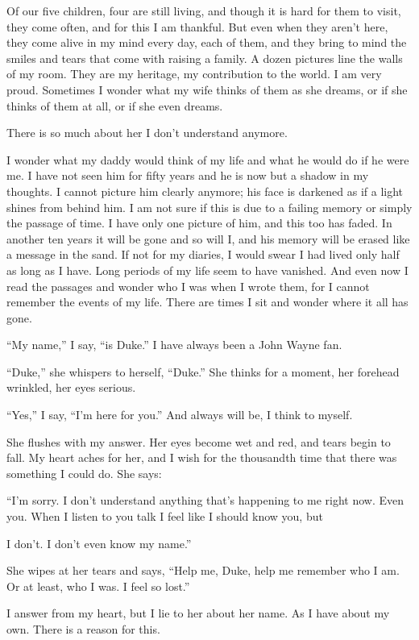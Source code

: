 \documentclass[10pt, twoside, openright]{book}
\begin{document}
Of our five children, four are still living, and though it is hard for
them to visit, they come often, and for this I am thankful. But even
when they aren't here, they come alive in my mind every day, each of
them, and they bring to mind the smiles and tears that come with raising
a family. A dozen pictures line the walls of my room. They are my
heritage, my contribution to the world. I am very proud. Sometimes I
wonder what my wife thinks of them as she dreams, or if she thinks of
them at all, or if she even dreams.

There is so much about her I don't understand anymore.

I wonder what my daddy would think of my life and what he would do if he
were me. I have not seen him for fifty years and he is now but a shadow
in my thoughts. I cannot picture him clearly anymore; his face is
darkened as if a light shines from behind him. I am not sure if this is
due to a failing memory or simply the passage of time. I have only one
picture of him, and this too has faded. In another ten years it will be
gone and so will I, and his memory will be erased like a message in the
sand. If not for my diaries, I would swear I had lived only half as long
as I have. Long periods of my life seem to have vanished. And even now I
read the passages and wonder who I was when I wrote them, for I cannot
remember the events of my life. There are times I sit and wonder where
it all has gone.


``My name,'' I say, ``is Duke.'' I have always been a John Wayne fan.


``Duke,'' she whispers to herself, ``Duke.'' She thinks for a moment,
her forehead wrinkled, her eyes serious.


``Yes,'' I say, ``I'm here for you.'' And always will be, I think to
myself.


She flushes with my answer. Her eyes become wet and red, and tears begin
to fall. My heart aches for her, and I wish for the thousandth time that
there was something I could do. She says:

``I'm sorry. I don't understand anything that's happening to me right
now. Even you. When I listen to you talk I feel like I should know you,
but

I don't. I don't even know my name.''

She wipes at her tears and says, ``Help me, Duke, help me remember who I
am. Or at least, who I was. I feel so lost.''

I answer from my heart, but I lie to her about her name. As I have about
my own. There is a reason for this.
\end{document}
